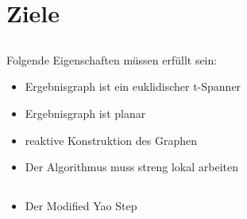 \documentclass[compress]{beamer}
\begin{document}
\section{Ziele}
\subsection{}
\begin{frame}
Folgende Eigenschaften müssen erfüllt sein:
\begin{itemize}
  \item Ergebnisgraph ist ein euklidischer t-Spanner
  \item Ergebnisgraph ist planar
  \item reaktive Konstruktion des Graphen
  \item Der Algorithmus muss streng lokal arbeiten
\end{itemize}
\end{frame}

\subsection{}
\begin{frame}
\begin{itemize}
	\item Der Modified Yao Step
\end{itemize}
\end{frame}
\end{document}
